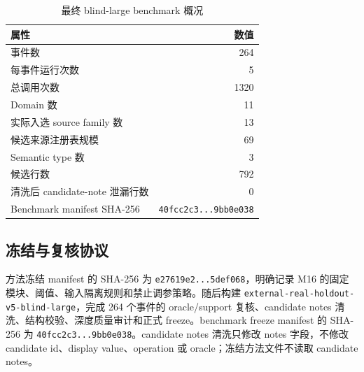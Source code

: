\documentclass[11pt]{article}
\begin{document}
\begin{table}[t]
\centering
\caption{最终 blind-large benchmark 概况}
\label{tab:dataset}
\begin{tabular}{lr}
\toprule
属性 & 数值 \\
\midrule
事件数 & 264 \\
每事件运行次数 & 5 \\
总调用次数 & 1320 \\
Domain 数 & 11 \\
实际入选 source family 数 & 13 \\
候选来源注册表规模 & 69 \\
Semantic type 数 & 3 \\
候选行数 & 792 \\
清洗后 candidate-note 泄漏行数 & 0 \\
Benchmark manifest SHA-256 & \texttt{40fcc2c3...9bb0e038} \\
\bottomrule
\end{tabular}
\end{table}

\subsection{冻结与复核协议}

方法冻结 manifest 的 SHA-256 为 \texttt{e27619e2...5def068}，明确记录 M16 的固定模块、阈值、输入隔离规则和禁止调参策略。随后构建 \texttt{external-real-holdout-v5-blind-large}，完成 264 个事件的 oracle/support 复核、candidate notes 清洗、结构校验、深度质量审计和正式 freeze。benchmark freeze manifest 的 SHA-256 为 \texttt{40fcc2c3...9bb0e038}。candidate notes 清洗只修改 notes 字段，不修改 candidate id、display value、operation 或 oracle；冻结方法文件不读取 candidate notes。
\end{document}
